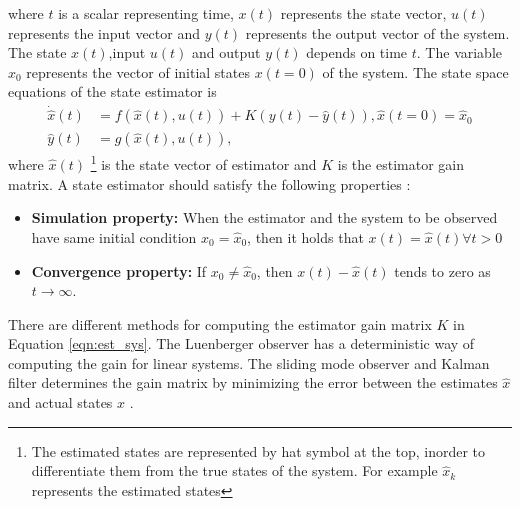 where $t$ is a scalar representing time, $x(t)$ represents the state vector, $u(t)$ represents the input vector and $y(t)$ represents the output vector of the system. The state $x(t)$,input $u(t)$ and output $y(t)$ depends on time $t$. The variable $x_0$ represents the vector of initial states $x(t=0)$ of the system. 
The state space equations of the state estimator is 
\begin{equation}
\begin{split}
\label{eqn:est_sys}
\dot{\hat{x}}(t) &= f(\hat{x}(t),u(t)) + K(y(t)-\hat{y}(t)) , \hat{x}(t=0) = \hat{x}_0  \\
\hat{y}(t) &= g(\hat{x}(t),u(t)),
\end{split}
\end{equation}
where $\hat{x}(t)$ \footnote{ The estimated states are represented by hat symbol at the top, inorder to differentiate them from the true states of the system. For example $\hat x_k$ represents the estimated states} is the state vector of estimator and $K$ is the estimator gain matrix.  A state estimator should satisfy the following properties \citep{gre01}:
\begin{itemize}
\item \textbf{Simulation property:} When the estimator and the system to be observed have same initial condition $x_0 = \hat{x}_0$, then it holds that $x(t) = \hat{x}(t) \forall t > 0 $
\item \textbf{Convergence property:} If $x_0 \neq \hat{x}_0$, then $x(t) - \hat{x}(t)$ tends to zero as $ t \rightarrow \infty $.
\end{itemize}

There are different methods for computing the estimator gain matrix $K$ in Equation \ref{eqn:est_sys}. The Luenberger observer has a deterministic way of computing the gain for linear systems. The sliding mode observer and Kalman filter determines the gain matrix by minimizing the error between the estimates $\hat{x}$ and actual states $x$ \citep{kha02}.